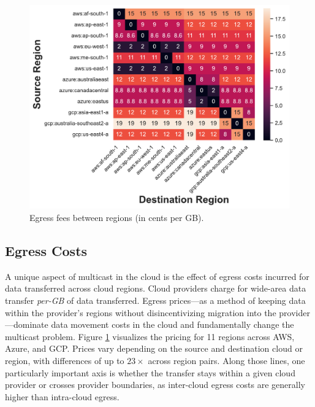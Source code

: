 
\begin{figure}[tbp]
     \centering
     \includegraphics[width=0.9\linewidth]{figures/cost_heatmap.pdf}
     \caption{Egress fees between regions (in cents per GB).}
     \label{fig:cost_heatmap}
\end{figure}
\subsection{Egress Costs}
A unique aspect of multicast in the cloud is the effect of egress costs incurred for data transferred across cloud regions.
%
Cloud providers charge for wide-area data transfer \textit{per-GB} of data transferred.
% 
Egress prices---as a method of keeping data within the provider's regions without disincentivizing migration into the provider---dominate data movement costs in the cloud and fundamentally change the multicast problem.
% 
Figure \ref{fig:cost_heatmap} visualizes the pricing for 11 regions across AWS, Azure, and GCP.
% 
Prices vary depending on the source and destination cloud or region, with differences of up to $23\times$ across region pairs.
%
Along those lines, one particularly important axis is whether the transfer stays within a given cloud provider or crosses provider boundaries, as inter-cloud egress costs are generally higher than intra-cloud egress.



